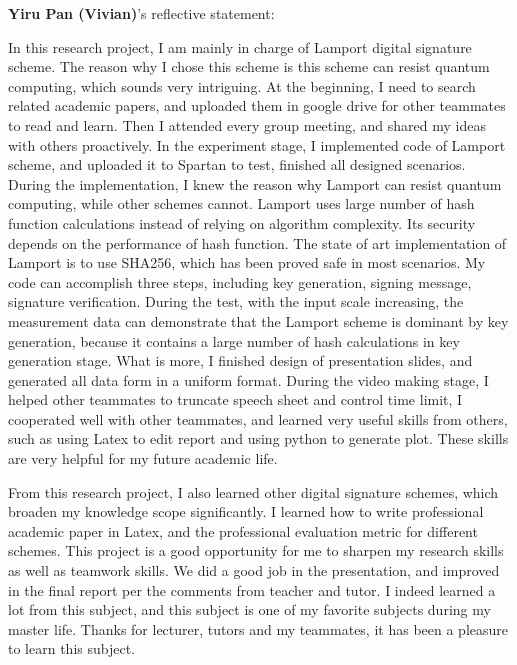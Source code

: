 \documentclass[10pt,sigconf]{acmart}
\begin{document}


\vspace{1em}

\noindent \textbf{Yiru Pan (Vivian)}'s reflective statement:

In this research project, I am mainly in charge of Lamport digital signature scheme. The reason why I chose this scheme is this scheme can resist quantum computing, which sounds very intriguing. At the beginning, I need to search related academic papers, and uploaded them in google drive for other teammates to read and learn. Then I attended every group meeting, and shared my ideas with others proactively. In the experiment stage, I implemented code of Lamport scheme, and uploaded it to Spartan to test, finished all designed scenarios. During the implementation, I knew the reason why Lamport can resist quantum computing, while other schemes cannot. Lamport uses large number of hash function calculations instead of relying on algorithm complexity. Its security depends on the performance of hash function. The state of art implementation of Lamport is to use SHA256, which has been proved safe in most scenarios. My code can accomplish three steps, including key generation, signing message, signature verification. During the test, 
with the input scale increasing, the measurement data can demonstrate that the Lamport scheme is dominant by key generation, because it contains a large number of hash calculations in key generation stage.
 What is more, I finished design of presentation slides, and generated all data form in a uniform format. During the video making stage, I helped other teammates to truncate speech sheet and control time limit, I cooperated well with other teammates, and learned very useful skills from others, such as using Latex to edit report and using python to generate plot. These skills are very helpful for my future academic life.

From this research project, I also learned other digital signature schemes, which broaden my knowledge scope significantly. I learned how to write professional academic paper in Latex, and the professional evaluation metric for different schemes. This project is a good opportunity for me to sharpen my research skills as well as teamwork skills. We did a good job in the presentation, and improved in the final report per the comments from teacher and tutor. I indeed learned a lot from this subject, and this subject is one of my favorite subjects during my master life. Thanks for lecturer, tutors and my teammates, it has been a pleasure to learn this subject. 
\end{document}
